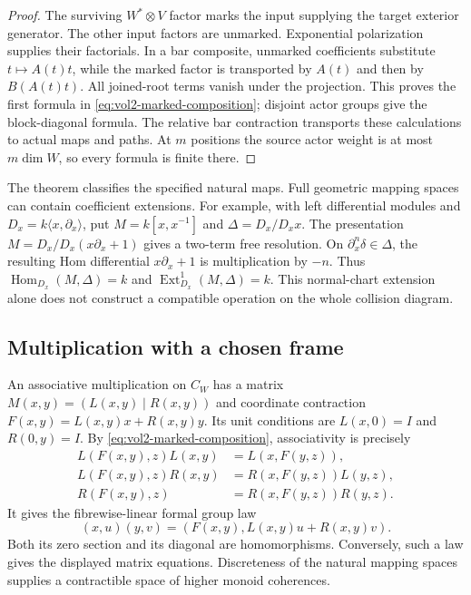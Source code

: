 \begin{proof}
The surviving $W^*\otimes V$ factor marks the input supplying
the target exterior generator. The other input factors are
unmarked. Exponential polarization supplies their factorials.
In a bar composite, unmarked coefficients substitute
$t\mapsto A(t)t$, while the marked factor is transported by
$A(t)$ and then by $B(A(t)t)$. All joined-root terms vanish
under the projection. This proves the first formula in
\eqref{eq:vol2-marked-composition}; disjoint actor groups give
the block-diagonal formula. The relative bar contraction
transports these calculations to actual maps and paths.
At $m$ positions the source actor weight is at most
$m\dim W$, so every formula is finite there.
\end{proof}

The theorem classifies the specified natural maps. Full
geometric mapping spaces can contain coefficient extensions.
For example, with left differential modules and
$D_x=k\langle x,\partial_x\rangle$, put
$M=k[x,x^{-1}]$ and $\Delta=D_x/D_xx$. The presentation
$M=D_x/D_x(x\partial_x+1)$ gives a two-term free resolution.
On $\partial_x^n\delta\in\Delta$, the resulting Hom
differential $x\partial_x+1$ is multiplication by $-n$.
Thus $\operatorname{Hom}_{D_x}(M,\Delta)=k$ and
$\operatorname{Ext}^1_{D_x}(M,\Delta)=k$. This normal-chart
extension alone does not construct a compatible operation on
the whole collision diagram.

\subsection{Multiplication with a chosen frame}

An associative multiplication on $C_W$ has a matrix
$M(x,y)=(L(x,y)\mid R(x,y))$ and coordinate contraction
$F(x,y)=L(x,y)x+R(x,y)y$. Its unit conditions are
$L(x,0)=I$ and $R(0,y)=I$. By
\eqref{eq:vol2-marked-composition}, associativity is precisely
\begin{equation}\label{eq:vol2-multiplication-blocks}
\begin{aligned}
 L(F(x,y),z)L(x,y)&=L(x,F(y,z)),\\
 L(F(x,y),z)R(x,y)&=R(x,F(y,z))L(y,z),\\
 R(F(x,y),z)&=R(x,F(y,z))R(y,z).
\end{aligned}
\end{equation}
It gives the fibrewise-linear formal group law
\[
 (x,u)(y,v)=(F(x,y),L(x,y)u+R(x,y)v).
\]
Both its zero section and its diagonal are homomorphisms.
Conversely, such a law gives the displayed matrix equations.
Discreteness of the natural mapping spaces supplies a
contractible space of higher monoid coherences.

